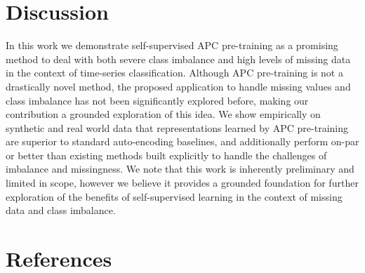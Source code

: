 \documentclass{article}
\begin{document}
\section{Discussion}
In this work we demonstrate self-supervised APC pre-training as a promising method to deal with both severe class imbalance and high levels of missing data in the context of time-series classification.
Although APC pre-training is not a drastically novel method, the proposed application to handle missing values and class imbalance has not been significantly explored before, making our contribution a grounded exploration of this idea.
We show empirically on synthetic and real world data that representations learned by APC pre-training are superior to standard auto-encoding baselines, and additionally perform on-par or better than existing methods built explicitly to handle the challenges of imbalance and missingness. We note that this work is inherently preliminary and limited in scope, however we believe it provides a grounded foundation for further exploration of the benefits of self-supervised learning in the context of missing data and class imbalance.


\section*{References}
\end{document}
